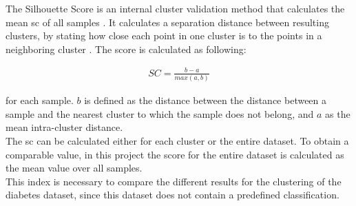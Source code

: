 The Silhouette Score is an internal cluster validation method that calculates the mean \acrfull{sc} of all samples \cite{scikitlearn}. It calculates a separation distance between resulting clusters, by stating how close each point in one cluster is to the points in a neighboring cluster \cite{sil_score}. The score is calculated as following: \cite{scikitlearn}

\begin{align}
    SC = \frac{b-a}{max(a,b)}
\end{align}

for each sample. $b$ is defined as the distance between the distance between a sample and the nearest cluster to which the sample does not belong, and $a$ as the mean intra-cluster distance.\\
The \acrshort{sc} can be calculated either for each cluster or the entire dataset. To obtain a comparable value, in this project the score for the entire dataset is calculated as the mean value over all samples. \cite{scikitlearn}\\
This index is necessary to compare the different results for the clustering of the diabetes dataset, since this dataset does not contain a predefined classification.